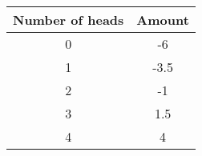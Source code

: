 \begin{tabular}{|c|c|}\hline
Number of heads		&Amount\\\hline
0		&-6\\\hline
1		&-3.5\\\hline
2		&-1\\\hline
3		&1.5\\\hline
4		&4\\\hline
\end{tabular}
